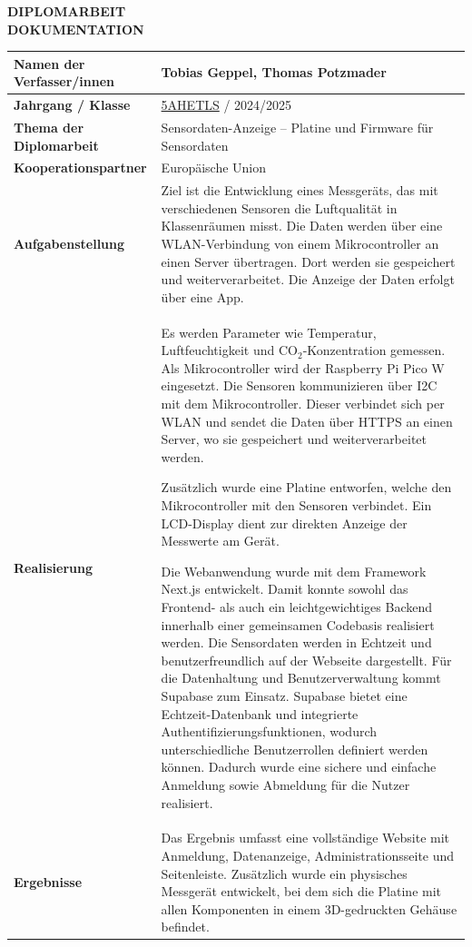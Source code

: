 \begin{inhalt}
\begin{center}
\begin{center}
    {\LARGE \textbf{DIPLOMARBEIT}}\\
    {\large \textbf{DOKUMENTATION}}
\end{center}

\vspace{1cm}

\begin{tabular}{|p{5cm}|p{10cm}|}
    \hline
    \textbf{Namen der Verfasser/innen} & Tobias Geppel, Thomas Potzmader \\
    \hline
    \textbf{Jahrgang / Klasse} & \href{https://www.htlstp.ac.at}{5AHETLS} / 2024/2025 \\
    \hline
    \textbf{Thema der Diplomarbeit} & Sensordaten-Anzeige – Platine und Firmware für Sensordaten \\
    \hline
    \textbf{Kooperationspartner} & Europäische Union \\
    \hline
    \textbf{Aufgabenstellung} & Ziel ist die Entwicklung eines Messgeräts, das mit verschiedenen Sensoren die Luftqualität in Klassenräumen misst. Die Daten werden über eine WLAN-Verbindung von einem Mikrocontroller an einen Server übertragen. Dort werden sie gespeichert und weiterverarbeitet. Die Anzeige der Daten erfolgt über eine App. \\
    \hline
    \textbf{Realisierung} & Es werden Parameter wie Temperatur, Luftfeuchtigkeit und CO$_2$-Konzentration gemessen. Als Mikrocontroller wird der Raspberry Pi Pico W eingesetzt. Die Sensoren kommunizieren über I2C mit dem Mikrocontroller. Dieser verbindet sich per WLAN und sendet die Daten über HTTPS an einen Server, wo sie gespeichert und weiterverarbeitet werden.

    Zusätzlich wurde eine Platine entworfen, welche den Mikrocontroller mit den Sensoren verbindet. Ein LCD-Display dient zur direkten Anzeige der Messwerte am Gerät.

    Die Webanwendung wurde mit dem Framework Next.js entwickelt. Damit konnte sowohl das Frontend- als auch ein leichtgewichtiges Backend innerhalb einer gemeinsamen Codebasis realisiert werden. Die Sensordaten werden in Echtzeit und benutzerfreundlich auf der Webseite dargestellt. Für die Datenhaltung und Benutzerverwaltung kommt Supabase zum Einsatz. Supabase bietet eine Echtzeit-Datenbank und integrierte Authentifizierungsfunktionen, wodurch unterschiedliche Benutzerrollen definiert werden können. Dadurch wurde eine sichere und einfache Anmeldung sowie Abmeldung für die Nutzer realisiert. \\
    \hline
    \textbf{Ergebnisse} & Das Ergebnis umfasst eine vollständige Website mit Anmeldung, Datenanzeige, Administrationsseite und Seitenleiste. Zusätzlich wurde ein physisches Messgerät entwickelt, bei dem sich die Platine mit allen Komponenten in einem 3D-gedruckten Gehäuse befindet. \\
    \hline
\end{tabular}
\end{center}
\end{inhalt}


